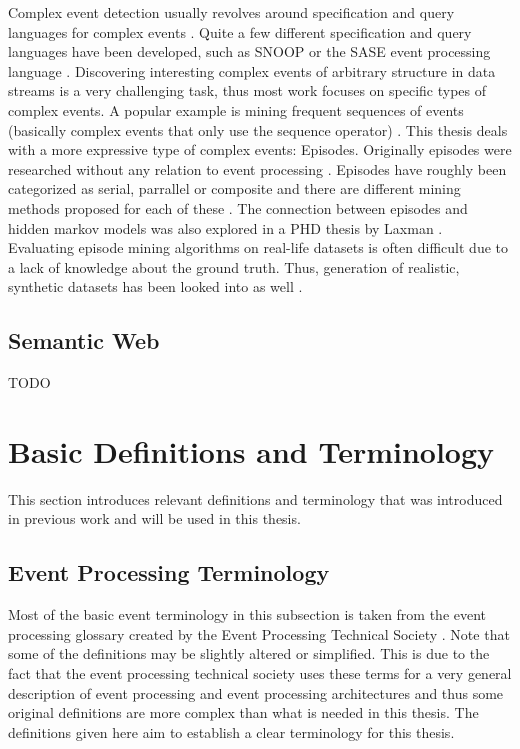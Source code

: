 Complex event detection usually revolves around specification and query languages for complex events \cite{eckert2009complex}. Quite a few different specification and query languages have been developed, such as SNOOP \cite{chakravarthy1994snoop} or the SASE event processing language \cite{wu2006high}. \newline
Discovering interesting complex events of arbitrary structure in data streams is a very challenging task, thus most work focuses on specific types of complex events. A popular example is mining frequent sequences of events (basically complex events that only use the sequence operator) \cite{bettini1998mining} \cite{hasan2015probabilistic}. \newline
This thesis deals with a more expressive type of complex events: Episodes. Originally episodes were researched without any relation to event processing \cite{mannila1995discovering}. 
Episodes have roughly been categorized as serial, parrallel or composite and there are different mining methods proposed for each of these \cite{mannila1995discovering} \cite{zhou2010mining}. The connection between episodes and hidden markov models was also explored in a PHD thesis by Laxman \cite{laxman2006discovering}.
Evaluating episode mining algorithms on real-life datasets is often difficult due to a lack of knowledge about the ground truth. Thus, generation of realistic, synthetic datasets has been looked into as well \cite{zimmermann2012generating}.

\subsection{Semantic Web}
\label{subsec_semanticWeb}
TODO


\section{Basic Definitions and Terminology}
This section introduces relevant definitions and terminology that was introduced in previous work and will be used in this thesis.

\subsection{Event Processing Terminology}
Most of the basic event terminology in this subsection is taken from the event processing glossary created by the Event Processing Technical Society \cite{luckham2011epts}. Note that some of the definitions may be slightly altered or simplified. This is due to the fact that the event processing technical society uses these terms for a very general description of event processing and event processing architectures and thus some original definitions are more complex than what is needed in this thesis. The definitions given here aim to establish a clear terminology for this thesis.

